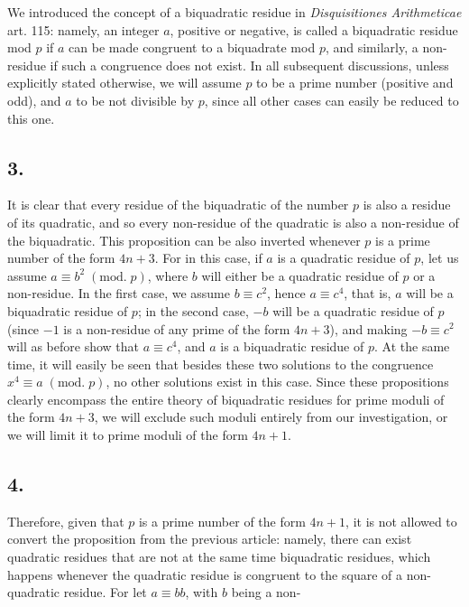 \documentclass[twoside,12pt, showframe]{memoir}
\renewcommand{\pmod}[1]{\;(\textrm{mod.}\;#1)}
\begin{document}
We introduced the concept of a biquadratic residue in \textit{Disquisitiones Arithmeticae} art. 115: namely, an integer \(a\), positive or negative, is called a biquadratic residue mod \(p\) if \(a\) can be made congruent to a biquadrate mod \(p\), and similarly, a non-residue if such a congruence does not exist. In all subsequent discussions, unless explicitly stated otherwise, we will assume \(p\) to be a prime number (positive and odd), and \(a\) to be not divisible by \(p\), since all other cases can easily be reduced to this one.
%

\subsection*{3.}

It is clear that every residue of the biquadratic of the number \(p\) is also a residue of its quadratic, and so every non-residue of the quadratic is also a non-residue of the biquadratic. This proposition can be also inverted whenever \(p\) is a prime number of the form \(4n+3\). For in this case, if \(a\) is a quadratic residue of \(p\), let us assume \(a \equiv b^2 \pmod{p}\), where \(b\) will either be a quadratic residue of \(p\) or a non-residue. In the first case, we assume \(b \equiv c^2\), hence \(a \equiv c^{4}\), that is, \(a\) will be a biquadratic residue of \(p\); in the second case, \(-b\) will be a quadratic residue of \(p\) (since \(-1\) is a non-residue of any prime of the form \(4n+3\)), and making \(-b \equiv c^2\) will as before show that \(a \equiv c^{4}\), and \(a\) is a biquadratic residue of \(p\). At the same time, it will easily be seen that besides these two solutions to the congruence \(x^{4} \equiv a\pmod{p}\), no other solutions exist in this case. Since these propositions clearly encompass the entire theory of biquadratic residues for prime moduli of the form \(4n+3\), we will exclude such moduli entirely from our investigation, or we will limit it to prime moduli of the form \(4n+1\).
%

\subsection*{4.}

Therefore, given that \(p\) is a prime number of the form \(4n+1\), it is not allowed to convert the proposition from the previous article: namely, there can exist quadratic residues that are not at the same time biquadratic residues, which happens whenever the quadratic residue is congruent to the square of a non-quadratic residue. For let \(a \equiv bb\), with \(b\) being a non-\clearpage\noindent%
 
\end{document}
